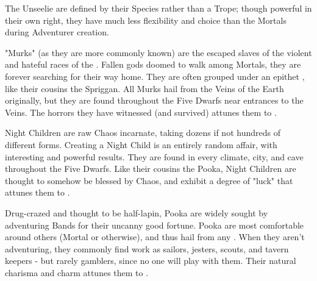 \begin{multicols*}{2}


 The Unseelie are defined by their Species rather than a Trope; though powerful in their own right, they have much less flexibility and choice than the Mortals during Adventurer creation.

{"Murks" (as they are more commonly known) are the escaped slaves of the violent and hateful races of the .  Fallen gods doomed to walk among Mortals, they are forever searching for their way home.  They are often grouped under an epithet , like their cousins the Spriggan. All Murks hail from the Veins of the Earth originally, but they are found throughout the Five Dwarfs near entrances to the Veins.  The horrors they have witnessed (and survived) attunes them to \CLR.}

{Night Children are raw Chaos incarnate, taking dozens if not hundreds of different forms.  Creating a Night Child is an entirely random affair, with interesting and powerful results. They are found in every climate, city, and cave throughout the Five Dwarfs. Like their cousins the Pooka, Night Children are thought to somehow be blessed by Chaos, and exhibit a degree of "luck" that attunes them to \TAL.}

{Drug-crazed and thought to be half-lapin, Pooka are widely sought by adventuring Bands for their uncanny good fortune. Pooka are most comfortable around others (Mortal or otherwise), and thus hail from any .  When they aren't adventuring, they commonly find work as sailors, jesters, scouts, and tavern keepers - but rarely gamblers, since no one will play with them.  Their natural charisma and charm attunes them to \PRE.}




\end{multicols*}
